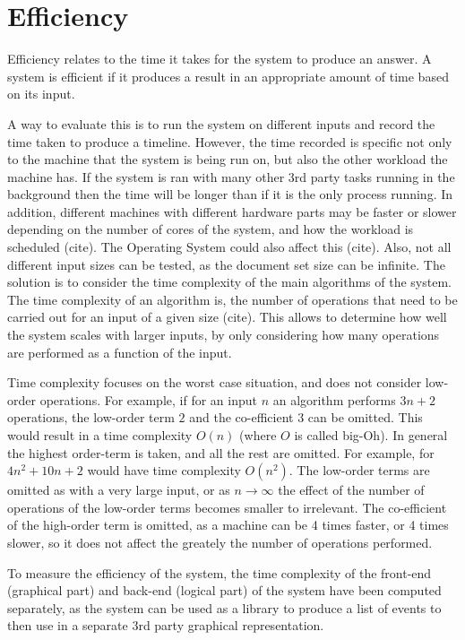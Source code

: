 \section{Efficiency}
\par Efficiency relates to the time it takes for the system to produce an answer. A system is efficient if it produces a result in an appropriate amount of time based on its input.
\par A way to evaluate this is to run the system on different inputs and record the time taken to produce a timeline. However, the time recorded is specific not only to the machine that the system is being run on, but also the other workload the machine has. If the system is ran with many other 3rd party tasks running in the background then the time will be longer than if it is the only process running. In addition, different machines with different hardware parts may be faster or slower depending on the number of cores of the system, and how the workload is scheduled (cite). The Operating System could also affect this (cite). Also, not all different input sizes can be tested, as the document set size can be infinite. The solution is to consider the time complexity of the main algorithms of the system. The time complexity of an algorithm is, the number of operations that need to be carried out for an input of a given size (cite). This allows to determine how well the system scales with larger inputs, by only considering how many operations are performed as a function of the input.
\par Time complexity focuses on the worst case situation, and does not consider low-order operations. For example, if for an input $n$ an algorithm performs $3n+2$ operations, the low-order term $2$ and the co-efficient $3$ can be omitted. This would result in a time complexity $O(n)$ (where $O$ is called big-Oh). In general the highest order-term is taken, and all the rest are omitted. For example, for $4n^2+10n+2$ would have time complexity $O(n^2)$.  The low-order terms are omitted as with a very large input, or as ${n\to\infty}$ the effect of the number of operations of the low-order terms becomes smaller to irrelevant. The co-efficient of the high-order term is omitted, as a machine can be 4 times faster, or 4 times slower, so it does not affect the greately the number of operations performed.
\par To measure the efficiency of the system, the time complexity of the front-end (graphical part) and back-end (logical part) of the system have been computed separately, as the system can be used as a library to produce a list of events to then use in a separate 3rd party graphical representation.
